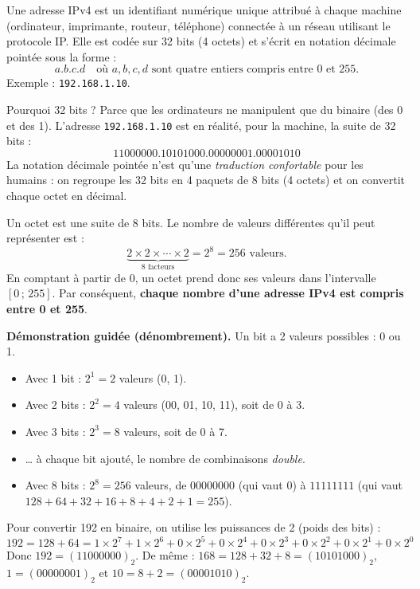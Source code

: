 \documentclass[11pt]{article}
\newcommand{\cle}[1]{{\popxbold\color{popdark}#1}}
\newcounter{popsec}
\newcounter{popsub}
\newcommand{\courssub}[1]{%
  \stepcounter{popsub}%
  \par\vspace{9pt}\noindent{\popxbold\fontsize{11.5}{13}\selectfont\color{popink}{\color{poporange}\thepopsec.\thepopsub}\hspace{6pt}#1}\par\nopagebreak\vspace{4pt}
}
\begin{document}
\courssub{Structure d'une adresse IPv4}

\begin{definition}
Une \cle{adresse IPv4} est un identifiant numérique unique attribué à chaque machine (ordinateur, imprimante, routeur, téléphone) connectée à un réseau utilisant le protocole IP. Elle est codée sur \cle{32 bits} (4 octets) et s'écrit en \cle{notation décimale pointée} sous la forme :
\[ a.b.c.d \quad \text{où } a, b, c, d \text{ sont quatre entiers compris entre } 0 \text{ et } 255. \]
Exemple : \texttt{192.168.1.10}.
\end{definition}

Pourquoi 32 bits ? Parce que les ordinateurs ne manipulent que du binaire (des 0 et des 1). L'adresse \texttt{192.168.1.10} est en réalité, pour la machine, la suite de 32 bits :
\[ 11000000.10101000.00000001.00001010 \]
La notation décimale pointée n'est qu'une \emph{traduction confortable} pour les humains : on regroupe les 32 bits en 4 paquets de 8 bits (4 octets) et on convertit chaque octet en décimal.

\begin{propriete}
Un octet est une suite de 8 bits. Le nombre de valeurs différentes qu'il peut représenter est :
\[ \underbrace{2 \times 2 \times \cdots \times 2}_{8 \text{ facteurs}} = 2^8 = 256 \text{ valeurs.} \]
En comptant à partir de 0, un octet prend donc ses valeurs dans l'intervalle $[0\,;\,255]$. Par conséquent, \textbf{chaque nombre d'une adresse IPv4 est compris entre 0 et 255}.
\end{propriete}

\textbf{Démonstration guidée (dénombrement).} Un bit a 2 valeurs possibles : 0 ou 1.
\begin{itemize}
  \item Avec 1 bit : $2^1 = 2$ valeurs (0, 1).
  \item Avec 2 bits : $2^2 = 4$ valeurs (00, 01, 10, 11), soit de 0 à 3.
  \item Avec 3 bits : $2^3 = 8$ valeurs, soit de 0 à 7.
  \item \ldots{} à chaque bit ajouté, le nombre de combinaisons \emph{double}.
  \item Avec 8 bits : $2^8 = 256$ valeurs, de $00000000$ (qui vaut 0) à $11111111$ (qui vaut $128+64+32+16+8+4+2+1 = 255$).
\end{itemize}

\begin{exemplebox}
Pour convertir 192 en binaire, on utilise les puissances de 2 (poids des bits) :
\[ 192 = 128 + 64 = 1\times 2^7 + 1\times 2^6 + 0\times 2^5 + 0\times 2^4 + 0\times 2^3 + 0\times 2^2 + 0\times 2^1 + 0\times 2^0 \]
Donc $192 = (11000000)_2$. De même : $168 = 128 + 32 + 8 = (10101000)_2$, $1 = (00000001)_2$ et $10 = 8 + 2 = (00001010)_2$.
\end{exemplebox}
\end{document}
